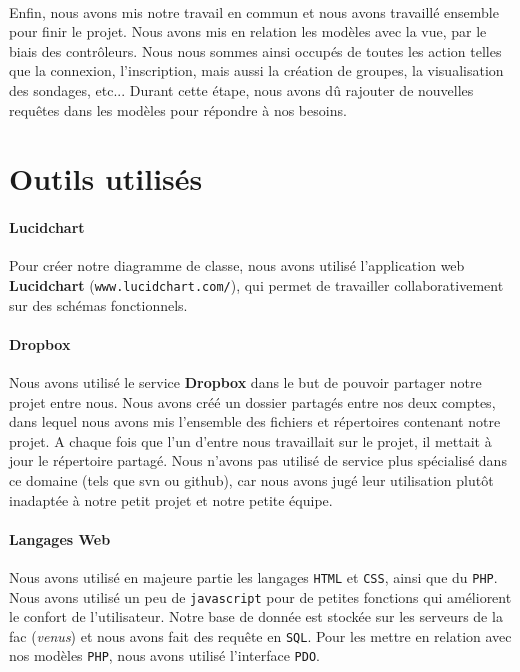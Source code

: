 \documentclass[a4paper,11pt]{article}
\begin{document}
\paragraph{}Enfin, nous avons mis notre travail en commun et nous avons travaillé ensemble pour finir le projet. Nous avons mis en relation les modèles avec la vue, par le biais des contrôleurs. Nous nous sommes ainsi occupés de toutes les action telles que la connexion, l'inscription, mais aussi la création de groupes, la visualisation des sondages, etc... Durant cette étape, nous avons dû rajouter de nouvelles requêtes dans les modèles pour répondre à nos besoins.
\section{Outils utilisés}
\paragraph{Lucidchart} Pour créer notre diagramme de classe, nous avons utilisé l'application web \textbf{Lucidchart} (\texttt{www.lucidchart.com/}), qui permet de travailler collaborativement sur des schémas fonctionnels.
\paragraph{Dropbox} Nous avons utilisé le service \textbf{Dropbox} dans le but de pouvoir partager notre projet entre nous. Nous avons créé un dossier partagés entre nos deux comptes, dans lequel nous avons mis l'ensemble des fichiers et répertoires contenant notre projet. A chaque fois que l'un d'entre nous travaillait sur le projet, il mettait à jour le répertoire partagé. Nous n'avons pas utilisé de service plus spécialisé dans ce domaine (tels que svn ou github), car nous avons jugé leur utilisation plutôt inadaptée à notre petit projet et notre petite équipe.
\paragraph{Langages Web} Nous avons utilisé en majeure partie les langages \texttt{HTML} et \texttt{CSS}, ainsi que du \texttt{PHP}. Nous avons utilisé un peu de \texttt{javascript} pour de petites fonctions qui améliorent le confort de l'utilisateur. Notre base de donnée est stockée sur les serveurs de la fac (\textit{venus}) et nous avons fait des requête en \texttt{SQL}. Pour les mettre en relation avec nos modèles \texttt{PHP}, nous avons utilisé l'interface \texttt{PDO}.
\end{document}
